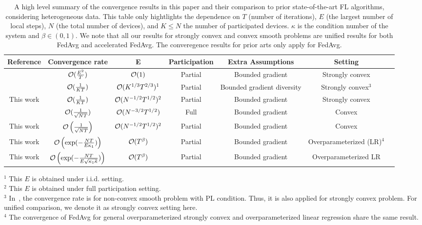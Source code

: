 \begin{table}[h!]
\centering
\hspace{-2em}
{\small
\begin{tabular}{|c|c|c|c|c|c|c|}
\hline Reference                 & Convergence rate    & E                           			& Participation & Extra Assumptions  		  & Setting  \\ \hline\hline 
\cite{li2019convergence}         & ${\mathcal{O}}(\frac{E^2}{T})$& ${\mathcal{O}}(1)$                    			& Partial       & Bounded gradient   		  & Strongly convex  \\ \hline
\cite{haddadpour2019convergence} & ${\mathcal{O}}(\frac{1}{KT})$ & ${\mathcal{O}}(K^{1/3}T^{2/3})^1$     			& Partial       & Bounded gradient diversity   & Strongly convex$^{3}$  \\ \hline
This work                        & ${\mathcal{O}}(\frac{1}{KT})$ & ${\mathcal{O}}(N^{-1/2}T^{1/2})^{2}$ 			& Partial       & Bounded gradient             & Strongly convex  \\\hline\hline
\cite{zanette2019tighter}  & ${\mathcal{O}}(\frac{1}{\sqrt{NT}})$ & ${\mathcal{O}}(N^{-3/2}T^{1/2})$     			& Full        & Bounded gradient             & Convex  \\\hline
This work      & ${\mathcal{O}}\left(\frac{1}{\sqrt{NT}}\right)$ &  ${\mathcal{O}}(N^{-1/2}T^{1/2})^{2}$			& Partial     & Bounded gradient            &  Convex   \\ \hline\hline
This work & ${\mathcal{O}}\left(\exp(-\frac{NT}{E\kappa_1})\right)$ & $ {\mathcal{O}}(T^{\beta})$                   &  Partial     & Bounded gradient    & Overparameterized (LR)$^{4}$ \\ \hline
This work & ${\mathcal{O}}\left(\exp(-\frac{NT}{E\sqrt{\kappa_1\tilde{\kappa}}})\right)$ & $ {\mathcal{O}}(T^{\beta})$  &  Partial     & Bounded gradient    & Overparameterized LR \\ \hline
\end{tabular}
}
\caption{A high level summary of the convergence results in this paper and their comparison to prior state-of-the-art FL algorithms, considering heterogeneous data. This table only hightlights the
dependence on $T$ (number of iterations), $E$ (the largest number of local steps), $N$ (the total number of devices), and $K\leq N$ the number of participated devices. 
$\kappa$ is the condition number of the system and $\beta \in (0,1)$. 
We note that all our results for strongly convex and convex smooth problems are unified results for both FedAvg and accelerated FedAvg. The converegence results for prior arts only apply for FedAvg.}
{\raggedright 
         $^1$ This $E$ is obtained under i.i.d. setting. \\
         $^{2}$ This $E$ is obtained under full participation setting. \\ 
         $^{3}$ In~\cite{haddadpour2019convergence}, the convergence rate is for non-convex smooth problem with PL condition. Thus, it is also applied for strongly convex problem. For unified comparison, we denote it as strongly convex setting here. \\
         $^{4}$ The convergence of FedAvg for general overparameterized strongly convex and overparameterized linear regression share the same result.  \par}
\label{tb:convergenceratev3}
\end{table}





